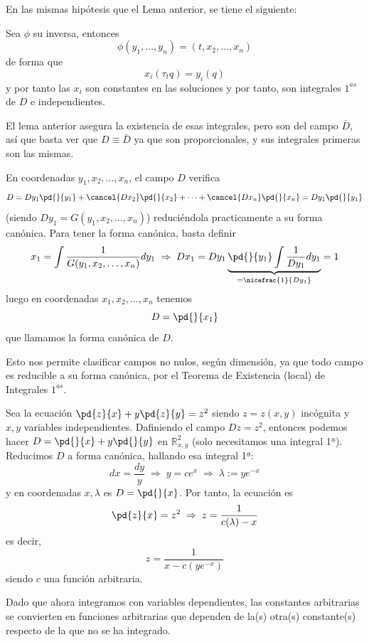          En las mismas hipótesis que el Lema anterior, se tiene el siguiente:
    \begin{teo}
        Sea $\phi$ su inversa, entonces $$\phi(y_1,\ldots, y_n)=(t,x_2,\ldots, x_n)$$
        de forma que $$x_i(\tau_tq)=y_i(q)$$
        y por tanto las $x_i$ son constantes en las soluciones y por tanto, son integrales $1^{as}$ de $D$ e independientes.
    \end{teo}
    \begin{dem}
        El lema anterior asegura la existencia de esas integrales, pero son del campo $\bar{D}$, así que basta ver que $D \equiv \bar{D}$ ya que son proporcionales, y sus integrales primeras son las mismas. 
    \end{dem}
    \begin{cor}
        En coordenadas $y_1, x_2, \ldots, x_n$, el campo $D$ verifica
        $$D=Dy_1 \pd{}{y_1}+ \cancel{Dx_2}\pd{}{x_2}+\cdots + \cancel{Dx_n} \pd{}{x_n}=Dy_1 \pd{}{y_1}$$
        (siendo $Dy_1=G(y_1,x_2, \ldots,x_n)$) reduciéndola practicamente a su forma canónica. Para tener la forma canónica, basta definir 
        $$x_1=\int \dfrac{1}{G(y_1,x_2, \ldots,x_n)} dy_1 \; \Rightarrow \; Dx_1 = Dy_1 \underbrace{\pd{}{y_1} \int \dfrac{1}{Dy_1}dy_1}_{=\nicefrac{1}{Dy_1}} = 1$$
        luego en coordenadas $x_1,x_2,\ldots,x_n$ tenemos 
        $$D=\pd{}{x_1}$$
        que llamamos la forma canónica de $D$.
    \end{cor}
    \begin{obs}
        Esto nos permite clasificar campos no nulos, según dimensión, ya que todo campo es reducible a su forma canónica, por el Teorema de Existencia (local) de Integrales $1^{as}$.
    \end{obs}
\begin{eje}
    Sea la ecuación $\pd{z}{x}+y\pd{z}{y} = z^2$ siendo $z=z(x,y)$ incógnita y $x,y$ variables independientes. Dafiniendo el campo $Dz=z^2$, entonces podemos hacer $D=\pd{}{x}+y\pd{}{y}$ en $\mathbb R^2_{x,y}$ (solo necesitamos una integral 1ª). Reducimos $D$ a forma canónica, hallando esa integral 1ª:
    $$dx=\dfrac{dy}{y} \; \Rightarrow \; y=c e^x \; \Rightarrow \; \lambda:=y e^{-x}$$
    y en coordenadas $x,\lambda$ es $D=\pd{}{x}$. Por tanto, la ecuación es 
    $$\pd{z}{x}=z^2 \; \Rightarrow \; z=\dfrac{1}{c(\lambda)-x}$$
    es decir, 
    $$z=\dfrac{1}{x-c(ye^{-x})}$$
    siendo $c$ una función arbitraria.
    \begin{obs}
        Dado que ahora integramos con variables dependientes, las constantes arbitrarias se convierten en funciones arbitrarias que dependen de la(s) otra(s) constante(s) respecto de la que no se ha integrado.
    \end{obs}
\end{eje}
